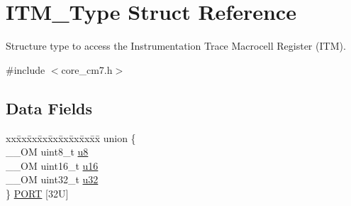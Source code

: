 \hypertarget{structITM__Type}{}\section{I\+T\+M\+\_\+\+Type Struct Reference}
\label{structITM__Type}


Structure type to access the Instrumentation Trace Macrocell Register (I\+TM).  




{\ttfamily \#include $<$core\+\_\+cm7.\+h$>$}

\subsection*{Data Fields}
\begin{DoxyCompactItemize}
\item 
\begin{tabbing}
xx\=xx\=xx\=xx\=xx\=xx\=xx\=xx\=xx\=\kill
union \{\\
\>\_\_OM uint8\_t \mbox{\hyperlink{structITM__Type_ae773bf9f9dac64e6c28b14aa39f74275}{u8}}\\
\>\_\_OM uint16\_t \mbox{\hyperlink{structITM__Type_a962a970dfd286cad7f8a8577e87d4ad3}{u16}}\\
\>\_\_OM uint32\_t \mbox{\hyperlink{structITM__Type_a5834885903a557674f078f3b71fa8bc8}{u32}}\\
\} \mbox{\hyperlink{structITM__Type_a86982b964e7e65e6ac1574016d8cd857}{PORT}} \mbox{[}32U\mbox{]}\\


\end{tabbing}
\end{DoxyCompactItemize}
